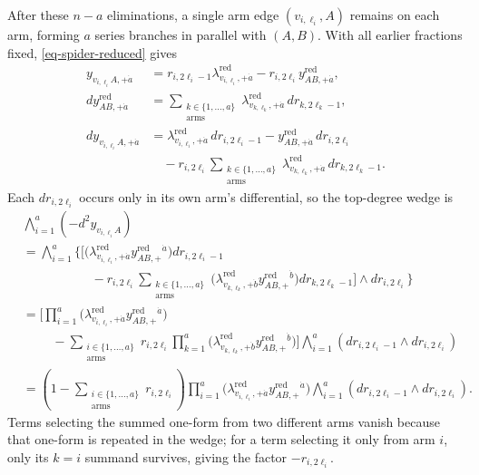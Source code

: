 \documentclass[11pt]{article}
\numberwithin{equation}{section}
\numberwithin{figure}{section}
\numberwithin{table}{section}
\begin{document}
\begin{proofbox}
After these $n-a$ eliminations, a single arm edge $(v_{i,\ell_i},A)$ remains on each arm, forming $a$ series branches in parallel with $(A,B)$.
With all earlier fractions fixed, \eqref{eq-spider-reduced} gives
\begin{equation}\label{eq-spider-terminal-arms}
\begin{aligned}
y_{v_{i,\ell_i}A,+\dot a}
&=r_{i,2\ell_i-1}\lambda_{v_{i,\ell_i},+\dot a}^{\mathrm{red}}
-r_{i,2\ell_i}y_{AB,+\dot a}^{\mathrm{red}},\\
dy_{AB,+\dot a}^{\mathrm{red}}
&=\sum_{\substack{k\in\{1,\ldots,a\}\\\mathrm{arms}}}
\lambda_{v_{k,\ell_k},+\dot a}^{\mathrm{red}}\,dr_{k,2\ell_k-1},\\
dy_{v_{i,\ell_i}A,+\dot a}
&=\lambda_{v_{i,\ell_i},+\dot a}^{\mathrm{red}}\,dr_{i,2\ell_i-1}
-y_{AB,+\dot a}^{\mathrm{red}}\,dr_{i,2\ell_i}\\
&\quad-r_{i,2\ell_i}
\sum_{\substack{k\in\{1,\ldots,a\}\\\mathrm{arms}}}
\lambda_{v_{k,\ell_k},+\dot a}^{\mathrm{red}}\,dr_{k,2\ell_k-1}.
\end{aligned}
\end{equation}
Each $dr_{i,2\ell_i}$ occurs only in its own arm's differential, so the top-degree wedge is
\begin{equation}\label{eq-spider-terminal-wedge}
\begin{aligned}
&\bigwedge_{i=1}^a(-d^2y_{v_{i,\ell_i}A})\\
&=\bigwedge_{i=1}^a\Bigg\{\Bigg[
\bigl(\lambda_{v_{i,\ell_i},+\dot a}^{\mathrm{red}}
y_{AB,+}^{\mathrm{red}}{}^{\dot a}\bigr)dr_{i,2\ell_i-1}\\
&\hspace{65pt}-r_{i,2\ell_i}
\sum_{\substack{k\in\{1,\ldots,a\}\\\mathrm{arms}}}
\bigl(\lambda_{v_{k,\ell_k},+\dot b}^{\mathrm{red}}
y_{AB,+}^{\mathrm{red}}{}^{\dot b}\bigr)dr_{k,2\ell_k-1}
\Bigg]\wedge dr_{i,2\ell_i}\Bigg\}\\
&=\Bigg[
\prod_{i=1}^a\bigl(\lambda_{v_{i,\ell_i},+\dot a}^{\mathrm{red}}
y_{AB,+}^{\mathrm{red}}{}^{\dot a}\bigr)\\
&\hspace{28pt}-\sum_{\substack{i\in\{1,\ldots,a\}\\\mathrm{arms}}}
r_{i,2\ell_i}
\prod_{k=1}^a\bigl(\lambda_{v_{k,\ell_k},+\dot b}^{\mathrm{red}}
y_{AB,+}^{\mathrm{red}}{}^{\dot b}\bigr)
\Bigg]\bigwedge_{i=1}^a(dr_{i,2\ell_i-1}\wedge dr_{i,2\ell_i})\\
&=\left(1-\sum_{\substack{i\in\{1,\ldots,a\}\\\mathrm{arms}}}
r_{i,2\ell_i}\right)
\prod_{i=1}^a\bigl(\lambda_{v_{i,\ell_i},+\dot a}^{\mathrm{red}}
y_{AB,+}^{\mathrm{red}}{}^{\dot a}\bigr)
\bigwedge_{i=1}^a(dr_{i,2\ell_i-1}\wedge dr_{i,2\ell_i}).
\end{aligned}
\end{equation}
Terms selecting the summed one-form from two different arms vanish because that one-form is repeated in the wedge; for a term selecting it only from arm $i$, only its $k=i$ summand survives, giving the factor $-r_{i,2\ell_i}$.


\end{proofbox}
\end{document}
